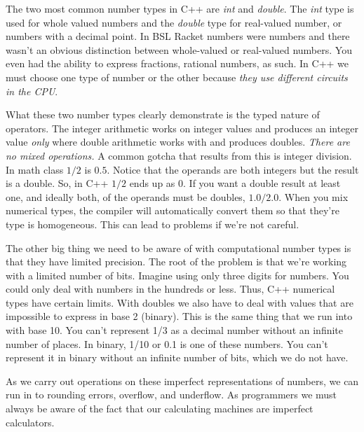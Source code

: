 \documentclass[]{tufte-handout}
\begin{document}
The two most common number types in C++ are \textit{int} and \textit{double}. The \textit{int} type is used for whole valued numbers and the \textit{double} type for real-valued number, or numbers with a decimal point. In BSL Racket numbers were numbers and there wasn't an obvious distinction between whole-valued or real-valued numbers. You even had the ability to express fractions, rational numbers, as such. In C++ we must choose one type of number or the other because \textit{they use different circuits in the CPU}. 


What these two number types clearly demonstrate is the typed nature of operators. The integer arithmetic works on integer values and produces an integer value \textit{only} where double arithmetic works with and produces doubles. \textit{There are no mixed operations.} A common gotcha that results from this is  integer division.  In math class $1/2$ is $0.5$. Notice that the operands are both integers but the result is a double. So, in C++ $1/2$ ends up as $0$. If you want a double result at least one, and ideally both, of the operands must be doubles, $1.0/2.0$.  When you mix numerical types, the compiler will automatically convert them so that they're type is homogeneous. This can lead to problems if we're not careful. 

The other big thing we need to be aware of with computational number types is that they have limited precision. The root of the problem is that we're working with a limited number of bits. Imagine using only three digits for numbers.  You could only deal with numbers in the hundreds or less.  Thus, C++ numerical types have certain limits.  With doubles we also have to deal with values that are impossible to express in base 2 (binary).  This is the same thing that we run into with base 10. You can't represent 1/3 as a decimal number without an infinite number of places.  In binary, 1/10 or 0.1 is one of these numbers. You can't represent it in binary without an infinite number of bits, which we do not have. 

As we carry out operations on these imperfect representations of numbers, we can run in to rounding errors, overflow, and underflow. As programmers we must always be aware of the fact that our calculating machines are imperfect calculators.
\end{document}
